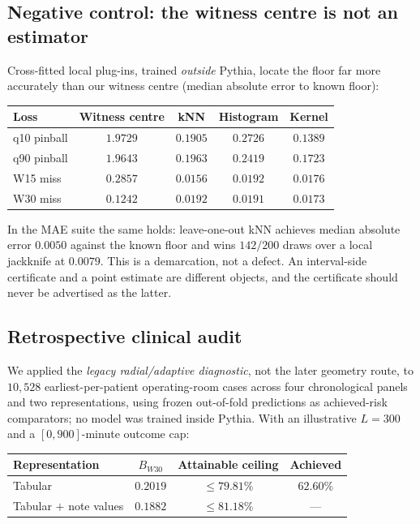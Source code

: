 \documentclass[11pt]{article}
\theoremstyle{definition}
\begin{document}
\subsection{Negative control: the witness centre is not an estimator}\label{sec:pointest}

Cross-fitted local plug-ins, trained \emph{outside} Pythia, locate the floor far more accurately than our witness centre (median absolute error to known floor):

\begin{center}
\begin{tabular}{lcccc}
\toprule
Loss & Witness centre & kNN & Histogram & Kernel \\
\midrule
q10 pinball & $1.9729$ & $0.1905$ & $0.2726$ & $\mathbf{0.1389}$ \\
q90 pinball & $1.9643$ & $0.1963$ & $0.2419$ & $\mathbf{0.1723}$ \\
W15 miss & $0.2857$ & $\mathbf{0.0156}$ & $0.0192$ & $0.0176$ \\
W30 miss & $0.1242$ & $0.0192$ & $0.0191$ & $\mathbf{0.0173}$ \\
\bottomrule
\end{tabular}
\end{center}

In the MAE suite the same holds: leave-one-out kNN achieves median absolute error $0.0050$ against the known floor and wins $142/200$ draws over a local jackknife at $0.0079$. This is a demarcation, not a defect. An interval-side certificate and a point estimate are different objects, and the certificate should never be advertised as the latter.

\subsection{Retrospective clinical audit}\label{sec:mayo}

We applied the \emph{legacy radial/adaptive diagnostic}, not the later geometry route, to $10{,}528$ earliest-per-patient operating-room cases across four chronological panels and two representations, using frozen out-of-fold predictions as achieved-risk comparators; no model was trained inside Pythia. With an illustrative $L=300$ and a $[0,900]$-minute outcome cap:

\begin{center}
\begin{tabular}{lccc}
\toprule
Representation & $B_{W30}$ & Attainable ceiling & Achieved \\
\midrule
Tabular & $0.2019$ & $\le 79.81\%$ & $62.60\%$ \\
Tabular $+$ note values & $0.1882$ & $\le 81.18\%$ & --- \\
\bottomrule
\end{tabular}
\end{center}
\end{document}
